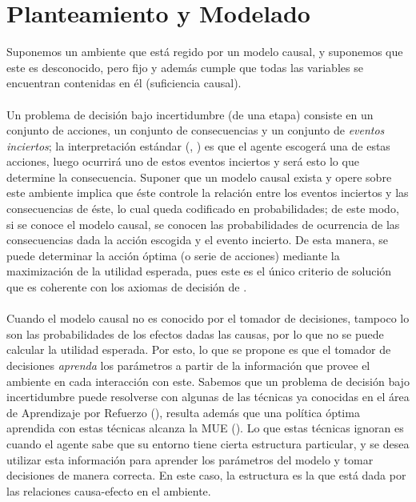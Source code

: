 \documentclass[11pt]{article}
\theoremstyle{plain}
\begin{document}
\section{Planteamiento y Modelado}{\label{planteamientoymodelado}}
Suponemos un ambiente que está regido por un modelo causal, y suponemos que este es desconocido, pero fijo y además cumple que todas las variables se encuentran contenidas en él (suficiencia causal).\\
\\
\indent Un problema de decisión bajo incertidumbre (de una etapa) consiste en un conjunto de acciones, un conjunto de consecuencias y un conjunto de \textit{eventos inciertos}; la interpretación estándar (\cite{bernardo2000bayesian}, \cite{gilboa2009decision}) es que el agente escogerá una de estas acciones, luego ocurrirá uno de estos eventos inciertos y será esto lo que determine la consecuencia. Suponer que un modelo causal exista y opere sobre este ambiente implica que éste controle la relación entre los eventos inciertos y las consecuencias de éste, lo cual queda codificado en probabilidades; de este modo, si se conoce el modelo causal, se conocen las probabilidades de ocurrencia de las consecuencias dada la acción escogida y el evento incierto. De esta manera, se puede determinar la acción óptima (o serie de acciones) mediante la maximización de la utilidad esperada, pues este es el único criterio de solución que es coherente con los axiomas de decisión de \cite{savage1954the}.\\
\\
\indent Cuando el modelo causal no es conocido por el tomador de decisiones, tampoco lo son las probabilidades de los efectos dadas las causas, por lo que no se puede calcular la utilidad esperada. Por esto, lo que se propone es que el tomador de decisiones \textit{aprenda} los parámetros a partir de la información que provee el ambiente en cada interacción con este. Sabemos que un problema de decisión bajo incertidumbre puede resolverse con algunas de las técnicas ya conocidas en el área de Aprendizaje por Refuerzo (\cite{sutton1998reinforcement}), resulta además que una política óptima aprendida con estas técnicas alcanza la MUE (\cite{webb2007game}). Lo que estas técnicas ignoran es cuando el agente sabe que su entorno tiene cierta estructura particular, y se desea utilizar esta información para aprender los parámetros del modelo y tomar decisiones de manera correcta. En este caso, la estructura es la que está dada por las relaciones causa-efecto en el ambiente.\\
\end{document}
